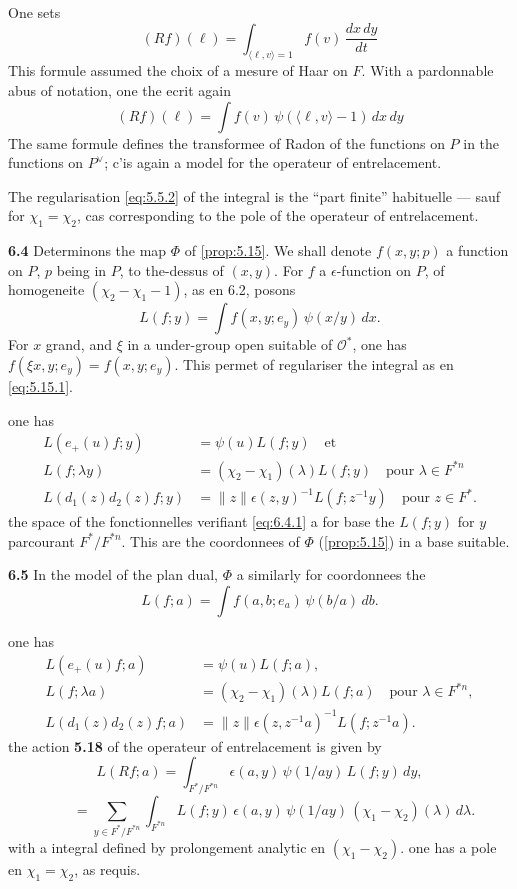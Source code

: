 \documentclass[12pt,a4paper]{article}
\theoremstyle{plain}
\theoremstyle{definition}
\theoremstyle{remark}
\newcommand{\cO}{\mathcal{O}}
\providecommand{\cO}{\mathcal{O}}
\begin{document}
One sets
\[
(Rf)(\ell) = \int_{\langle \ell, v \rangle = 1} f(v) \, \frac{dx \, dy}{dt}
\]
This formule assumed the choix of a mesure of Haar on $F$. With a pardonnable abus of notation, one the ecrit again
\[
(Rf)(\ell) = \int f(v) \, \psi(\langle \ell, v \rangle - 1) \, dx \, dy
\]
The same formule defines the transformee of Radon of the functions on $P$ in the functions on $P^\vee$; c'is again a model for the operateur of entrelacement.

The regularisation \eqref{eq:5.5.2} of the integral is the ``part finite'' habituelle --- sauf for $\chi_1 = \chi_2$, cas corresponding to the pole of the operateur of entrelacement.

\textbf{6.4} Determinons the map $\Phi$ of \ref{prop:5.15}. We shall denote $f(x, y; p)$ a function on $P$, $p$ being in $P$, to the-dessus of $(x, y)$. For $f$ a $\epsilon$-function on $P$, of homogeneite $(\chi_2 - \chi_1 - 1)$, as en 6.2, posons
\[
L(f; y) = \int f(x, y; e_y) \, \psi(x/y) \, dx.
\]
For $x$ grand, and $\xi$ in a under-group open suitable of $\cO^*$, one has $f(\xi x, y; e_y) = f(x, y; e_y)$. This permet of regulariser the integral as en \eqref{eq:5.15.1}.

one has
\begin{align}
L(e_+(u)f; y) &= \psi(u) L(f; y) \quad \text{et} \label{eq:6.4.1} \\
L(f; \lambda y) &= (\chi_2 - \chi_1)(\lambda) L(f; y) \quad \text{pour } \lambda \in F^{*n} \label{eq:6.4.2} \\
L(d_1(z) d_2(z) f; y) &= \|z\| \epsilon(z, y)^{-1} L(f; z^{-1} y) \quad \text{pour } z \in F^*. \label{eq:6.4.3}
\end{align}
the space of the fonctionnelles verifiant \eqref{eq:6.4.1} a for base the $L(f; y)$ for $y$ parcourant $F^*/F^{*n}$. This are the coordonnees of $\Phi$ (\ref{prop:5.15}) in a base suitable.

\textbf{6.5} In the model of the plan dual, $\Phi$ a similarly for coordonnees the
\[
L(f; a) = \int f(a, b; e_a) \, \psi(b/a) \, db.
\]

one has
\begin{align}
L(e_+(u)f; a) &= \psi(u) L(f; a), \label{eq:6.5.1} \\
L(f; \lambda a) &= (\chi_2 - \chi_1)(\lambda) L(f; a) \quad \text{pour } \lambda \in F^{*n}, \label{eq:6.5.2} \\
L(d_1(z) d_2(z) f; a) &= \|z\| \epsilon(z, z^{-1} a)^{-1} L(f; z^{-1} a). \label{eq:6.5.3}
\end{align}
the action \textbf{5.18} of the operateur of entrelacement is given by
\begin{equation}\label{eq:6.5.4}
L(Rf; a) = \int_{F^*/F^{*n}} \epsilon(a, y) \, \psi(1/ay) \, L(f; y) \, dy,
\tag{6.5.4}
\end{equation}
\[
\qquad = \sum_{y \in F^*/F^{*n}} \int_{F^{*n}} L(f; y) \, \epsilon(a, y) \, \psi(1/ay) \, (\chi_1 - \chi_2)(\lambda) \, d\lambda.
\]
with a integral defined by prolongement analytic en $(\chi_1 - \chi_2)$. one has a pole en $\chi_1 = \chi_2$, as requis.
\end{document}
